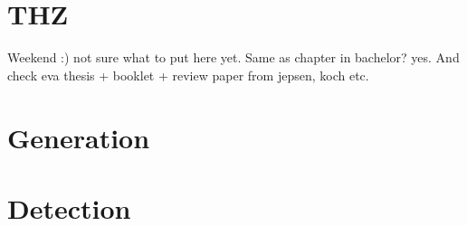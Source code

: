 \section{THZ}
Weekend :)
not sure what to put here yet. Same as chapter in bachelor? yes. And check eva thesis + booklet + review paper from jepsen, koch etc.

\section{Generation}

\section{Detection}